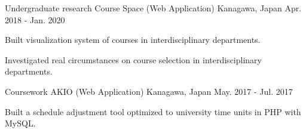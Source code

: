 

\begin{cventries}

  \cventry
    {Undergraduate research} %
    {Course Space (Web Application)} %
    {Kanagawa, Japan} %
    {Apr. 2018 - Jan. 2020} %
    {
      \begin{cvitems} %
        \item {Built visualization system of courses in interdisciplinary departments.}
        \item {Investigated real circumstances on course selection in interdisciplinary departments.}
      \end{cvitems}
    }

  \cventry
    {Coursework} %
    {AKIO (Web Application)} %
    {Kanagawa, Japan} %
    {May. 2017 - Jul. 2017} %
    {
      \begin{cvitems} %
        \item {Built a schedule adjustment tool optimized to university time units in PHP with MySQL.}
      \end{cvitems}
    }

\end{cventries}
